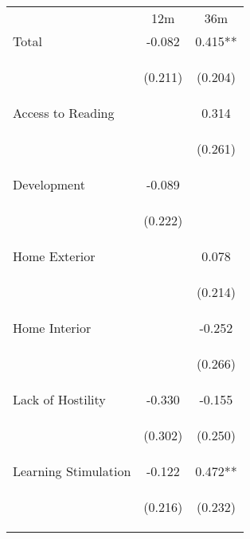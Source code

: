 \begin{tabular}{lcc}
\hline \noalign{\smallskip} & 12m & 36m\\
\noalign{\smallskip}\hline \noalign{\smallskip}Total & -0.082 & 0.415**\\
 & \begin{footnotesize}(0.211)\end{footnotesize} & \begin{footnotesize}(0.204)\end{footnotesize}\\
\noalign{\smallskip}Access to Reading &  & 0.314\\
 & \begin{footnotesize}\end{footnotesize} & \begin{footnotesize}(0.261)\end{footnotesize}\\
\noalign{\smallskip}Development & -0.089 & \\
 & \begin{footnotesize}(0.222)\end{footnotesize} & \begin{footnotesize}\end{footnotesize}\\
\noalign{\smallskip}Home Exterior &  & 0.078\\
 & \begin{footnotesize}\end{footnotesize} & \begin{footnotesize}(0.214)\end{footnotesize}\\
\noalign{\smallskip}Home Interior &  & -0.252\\
 & \begin{footnotesize}\end{footnotesize} & \begin{footnotesize}(0.266)\end{footnotesize}\\
\noalign{\smallskip}Lack of Hostility & -0.330 & -0.155\\
 & \begin{footnotesize}(0.302)\end{footnotesize} & \begin{footnotesize}(0.250)\end{footnotesize}\\
\noalign{\smallskip}Learning Stimulation & -0.122 & 0.472**\\
 & \begin{footnotesize}(0.216)\end{footnotesize} & \begin{footnotesize}(0.232)\end{footnotesize}\\

\end{tabular}
